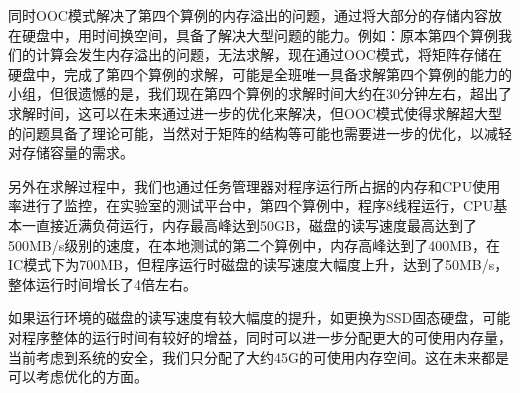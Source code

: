 \documentclass[forprint]{WHUBachelor}
\begin{document}
同时OOC模式解决了第四个算例的内存溢出的问题，通过将大部分的存储内容放在硬盘中，用时间换空间，具备了解决大型问题的能力。例如：{\color{red}原本第四个算例我们的计算会发生内存溢出的问题，无法求解，现在通过OOC模式，将矩阵存储在硬盘中，完成了第四个算例的求解，可能是全班唯一具备求解第四个算例的能力的小组}，但很遗憾的是，我们现在第四个算例的求解时间大约在30分钟左右，超出了求解时间，这可以在未来通过进一步的优化来解决，但OOC模式使得求解超大型的问题具备了理论可能，当然对于矩阵的结构等可能也需要进一步的优化，以减轻对存储容量的需求。\par
另外在求解过程中，我们也通过任务管理器对程序运行所占据的内存和CPU使用率进行了监控，在实验室的测试平台中，第四个算例中，程序8线程运行，CPU基本一直接近满负荷运行，内存最高峰达到50GB，磁盘的读写速度最高达到了500MB/s级别的速度，在本地测试的第二个算例中，内存高峰达到了400MB，在IC模式下为700MB，但程序运行时磁盘的读写速度大幅度上升，达到了50MB/s，整体运行时间增长了4倍左右。\par
如果运行环境的磁盘的读写速度有较大幅度的提升，如更换为SSD固态硬盘，可能对程序整体的运行时间有较好的增益，同时可以进一步分配更大的可使用内存量，当前考虑到系统的安全，我们只分配了大约45G的可使用内存空间。这在未来都是可以考虑优化的方面。
\end{document}
